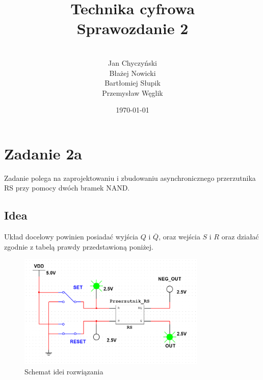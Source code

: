 \documentclass[12pt,a4paper,openright]{mwrep}
\begin{document}
\title{%
Technika cyfrowa\\
Sprawozdanie 2\\
}

\author{\\Jan Chyczyński\\Błażej Nowicki
\\Bartłomiej Słupik\\Przemysław Węglik}

\date{\today}

\maketitle

\chapter{Zadanie 2a}
Zadanie polega na zaprojektowaniu i zbudowaniu asynchronicznego przerzutnika RS przy pomocy dwóch bramek NAND.

\section{Idea}
Układ docelowy powinien posiadać wyjścia $Q$ i $\overline{Q}$, oraz wejścia $S$ i $R$ oraz działać zgodnie z tabelą prawdy
przedstawioną poniżej.

\begin{figure}[H]
    \centering
    \includegraphics[width=0.8\textwidth]{images/2a_circuit_blackbox.png}
    \caption{Schemat idei rozwiązania}
    \label{rys:2a_circuit_blackbox}
\end{figure}
\end{document}
